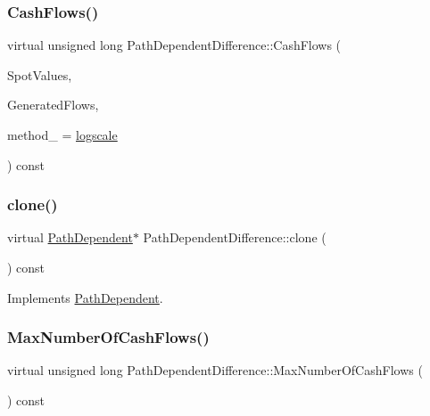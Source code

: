 \subsubsection{\texorpdfstring{Cash\+Flows()}{CashFlows()}}
{\footnotesize\ttfamily virtual unsigned long Path\+Dependent\+Difference\+::\+Cash\+Flows (\begin{DoxyParamCaption}\item[{const \hyperlink{classMJArray}{M\+J\+Array} \&}]{Spot\+Values,  }\item[{std\+::vector$<$ Cash\+Flow $>$ \&}]{Generated\+Flows,  }\item[{\hyperlink{PathDependent_8h_abed946c62f140eb7ff2ac742e6ad9497}{method}}]{method\+\_\+ = {\ttfamily \hyperlink{PathDependent_8h_abed946c62f140eb7ff2ac742e6ad9497a064d3d3358889658ce07fe9f3191d1fd}{logscale}} }\end{DoxyParamCaption}) const\hspace{0.3cm}{\ttfamily [virtual]}}

\hypertarget{classPathDependentDifference_a80b73ef2b45a79684153575f3f508dc5}{}\label{classPathDependentDifference_a80b73ef2b45a79684153575f3f508dc5} 
\subsubsection{\texorpdfstring{clone()}{clone()}}
{\footnotesize\ttfamily virtual \hyperlink{classPathDependent}{Path\+Dependent}$\ast$ Path\+Dependent\+Difference\+::clone (\begin{DoxyParamCaption}{ }\end{DoxyParamCaption}) const\hspace{0.3cm}{\ttfamily [virtual]}}



Implements \hyperlink{classPathDependent_afcc10647f591175642c6dc0adba23f0b}{Path\+Dependent}.

\hypertarget{classPathDependentDifference_a2548403f4f6b3425254cde6f263534a8}{}\label{classPathDependentDifference_a2548403f4f6b3425254cde6f263534a8} 
\subsubsection{\texorpdfstring{Max\+Number\+Of\+Cash\+Flows()}{MaxNumberOfCashFlows()}}
{\footnotesize\ttfamily virtual unsigned long Path\+Dependent\+Difference\+::\+Max\+Number\+Of\+Cash\+Flows (\begin{DoxyParamCaption}{ }\end{DoxyParamCaption}) const\hspace{0.3cm}{\ttfamily [virtual]}}



